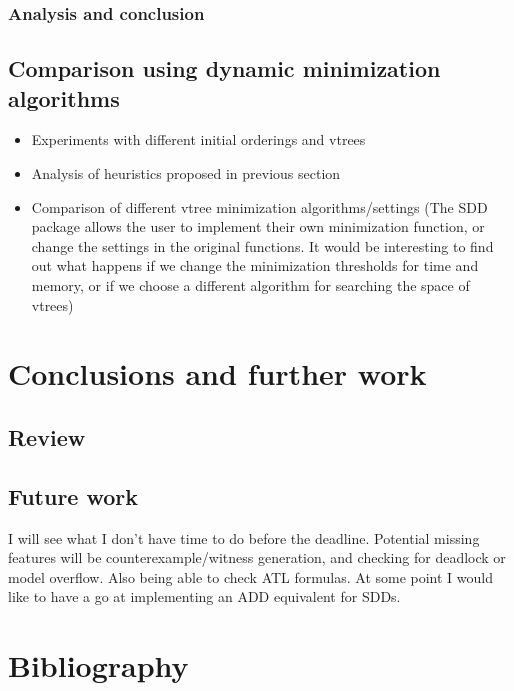 \documentclass[12]{article}
\begin{document}
\subsubsection{Analysis and conclusion}



\subsection{Comparison using dynamic minimization algorithms}
\begin{itemize}
\item Experiments with different initial orderings and vtrees
\item Analysis of heuristics proposed in previous section
\item Comparison of different vtree minimization algorithms/settings (The SDD package allows the user to implement their own minimization function, or change the settings in the original functions. It would be interesting to find out what happens if we change the minimization thresholds for time and memory, or if we choose a different algorithm for searching the space of vtrees) 
\end{itemize}


\section{Conclusions and further work}

\subsection{Review}

\subsection{Future work}

I will see what I don't have time to do before the deadline. 
Potential missing features will be counterexample/witness generation, and checking for deadlock or model overflow. Also being able to check ATL formulas.
At some point I would like to have a go at implementing an ADD equivalent for SDDs.

\section{Bibliography}
\end{document}
